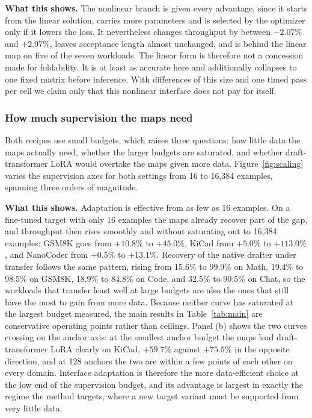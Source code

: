 \textbf{What this shows.} The nonlinear branch is given every advantage, since it starts from the linear solution, carries more parameters and is selected by the optimizer only if it lowers the loss. It nevertheless changes throughput by between $-2.07\%$ and $+2.97\%$, leaves acceptance length almost unchanged, and is behind the linear map on five of the seven workloads. The linear form is therefore not a concession made for foldability. It is at least as accurate here and additionally collapses to one fixed matrix before inference. With differences of this size and one timed pass per cell we claim only that this nonlinear interface does not pay for itself.

\subsubsection{How much supervision the maps need}
\label{sec:ablation-budget}
Both recipes use small budgets, which raises three questions: how little data the maps actually need, whether the larger budgets are saturated, and whether draft-transformer LoRA would overtake the maps given more data. Figure~\ref{fig:scaling} varies the supervision axes for both settings from 16 to 16{,}384 examples, spanning three orders of magnitude.



\textbf{What this shows.} Adaptation is effective from as few as 16 examples. On a fine-tuned target with only 16 examples the maps already recover part of the gap, and throughput then rises smoothly and without saturating out to 16{,}384 examples: GSM8K goes from $+10.8\%$ to $+45.0\%$, KiCad from $+5.0\%$ to $+113.0\%$, and NanoCoder from $+0.5\%$ to $+13.1\%$. Recovery of the native drafter under transfer follows the same pattern, rising from 15.6\% to 99.9\% on Math, 19.4\% to 98.5\% on GSM8K, 18.9\% to 84.8\% on Code, and 32.5\% to 90.5\% on Chat, so the workloads that transfer least well at large budgets are also the ones that still have the most to gain from more data. Because neither curve has saturated at the largest budget measured, the main results in Table~\ref{tab:main} are conservative operating points rather than ceilings. Panel (b) shows the two curves crossing on the anchor axis: at the smallest anchor budget the maps lead draft-transformer LoRA clearly on KiCad, $+59.7\%$ against $+75.5\%$ in the opposite direction, and at 128 anchors the two are within a few points of each other on every domain. Interface adaptation is therefore the more data-efficient choice at the low end of the supervision budget, and its advantage is largest in exactly the regime the method targets, where a new target variant must be supported from very little data.

